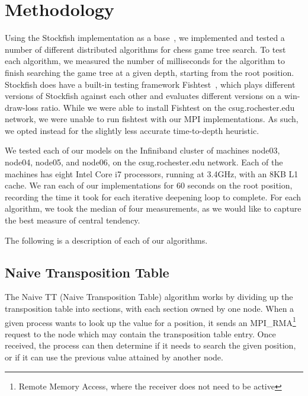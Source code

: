 \documentclass{article}
\begin{document}
\section{Methodology}\label{Algorithms}
Using the Stockfish implementation as a base~\cite{stockfish:code},
we implemented and tested a number
of different distributed algorithms for chess game tree search. To test each
algorithm, we measured the number of milliseconds for the algorithm to finish
searching the game tree at a given depth, starting from the root position.
Stockfish does have a built-in testing framework Fishtest~\cite{fishtest:code},
which plays different versions of Stockfish against each other and evaluates
different versions on a win-draw-loss ratio. While we were able to install Fishtest 
on the csug.rochester.edu network, we were unable to run fishtest with our MPI
implementations. As such, we opted instead for the 
slightly less accurate time-to-depth heuristic.

We tested each of our models on the Infiniband cluster of machines
node03, node04, node05, and node06, on the csug.rochester.edu network.
Each of the machines has eight Intel Core i7 processors, running at 3.4GHz, with
an 8KB L1 cache. We ran each of our implementations for 60
seconds on the root position, recording the time it took for each iterative
deepening loop to complete. For each algorithm, we took the median of four 
measurements, as we would like to capture the best measure of central tendency.

The following is a description of each of our algorithms.

\subsection{Naive Transposition Table}
The Naive TT (Naive Transposition Table) algorithm works by dividing up the
transposition table into sections, with each section owned by one node. When a
given process wants to look up the value for a position, it sends an
{MPI\_RMA}\footnote{Remote Memory Access, where the receiver does not need to be active}
request to the node which may contain the transposition table entry. Once
received, the process can then determine if it needs to search the given
position, or if it can use the previous value attained by another node.
\end{document}
